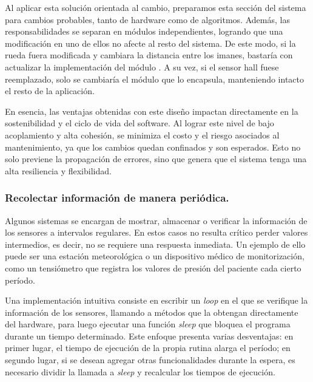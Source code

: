 Al aplicar esta solución orientada al cambio, preparamos esta sección del sistema para cambios probables, tanto de hardware como de algoritmos. Además, las responsabilidades se separan en módulos independientes, logrando que una modificación en uno de ellos no afecte al resto del sistema. De este modo, si la rueda fuera modificada y cambiara la distancia entre los imanes, bastaría con actualizar la implementación del módulo \SensorVelocidad. A su vez, si el sensor \gls{hall} fuese reemplazado, solo se cambiaría el módulo que lo encapsula, manteniendo intacto el resto de la aplicación.

En esencia, las ventajas obtenidas con este diseño impactan directamente en la sostenibilidad y el ciclo de vida del software. Al lograr este nivel de bajo acoplamiento y alta cohesión, se minimiza el costo y el riesgo asociados al mantenimiento, ya que los cambios quedan confinados y son esperados. Esto no solo previene la propagación de errores, sino que genera que el sistema tenga una alta resiliencia y flexibilidad.


\subsubsection*{Recolectar información de manera periódica.}

Algunos sistemas se encargan de mostrar, almacenar o verificar la información de los sensores a intervalos regulares. En estos casos no resulta crítico perder valores intermedios, es decir, no se requiere una respuesta inmediata. Un ejemplo de ello puede ser una estación meteorológica o un dispositivo médico de monitorización, como un tensiómetro que registra los valores de presión del paciente cada cierto período.

Una implementación intuitiva consiste en escribir un \textit{loop} en el que se verifique la información de los sensores, llamando a métodos que la obtengan directamente del hardware, para luego ejecutar una función \textit{sleep} que bloquea el programa durante un tiempo determinado. Este enfoque presenta varias desventajas: en primer lugar, el tiempo de ejecución de la propia rutina alarga el período; en segundo lugar, si se desean agregar otras funcionalidades durante la espera, es necesario dividir la llamada a \textit{sleep} y recalcular los tiempos de ejecución.

